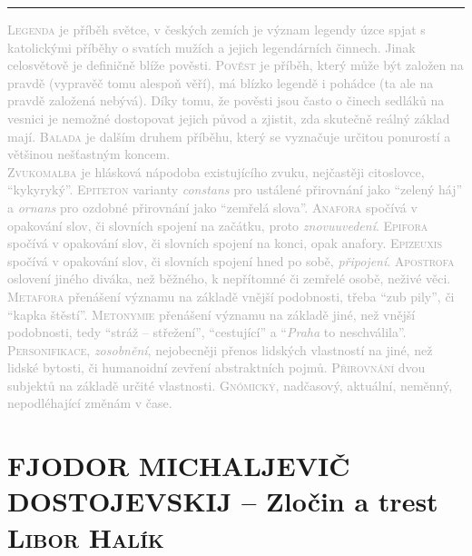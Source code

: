 \documentclass[A4paper]{extarticle} %
\begin{document}
\noindent\begin{minipage}{\textwidth}
    \textcolor{darkgray}{\rule{\linewidth}{0.4pt}
    \changefontsize{7pt}
    \footnotesize
    \textsc{Legenda} je příběh světce, v českých zemích je význam legendy úzce spjat s katolickými příběhy o svatích mužích a jejich legendárních činnech. Jinak celosvětově je definičně blíže pověsti.
    \textsc{Pověst} je příběh, který může být založen na pravdě (vypravěč tomu alespoň věří), má blízko legendě i pohádce (ta ale na pravdě založená nebývá). Díky tomu, že pověsti jsou často o činech sedláků na vesnici je nemožné dostopovat jejich původ a zjistit, zda skutečně reálný základ mají.
    \textsc{Balada} je dalším druhem příběhu, který se vyznačuje určitou ponurostí a většinou nešťastným koncem. \\
    \textsc{Zvukomalba} je hlásková nápodoba existujícího zvuku, nejčastěji citoslovce, \enquote{kykyryký}.
    \textsc{Epiteton} varianty \textit{constans} pro ustálené přirovnání jako \enquote{zelený háj} a \textit{ornans} pro ozdobné přirovnání jako \enquote{zemřelá slova}.
    \textsc{Anafora} spočívá v opakování slov, či slovních spojení na začátku, proto \textit{znovuuvedení}.
    \textsc{Epifora} spočívá v opakování slov, či slovních spojení na konci, opak anafory.
    \textsc{Epizeuxis} spočívá v opakování slov, či slovních spojení hned po sobě, \textit{připojení}.
    \textsc{Apostrofa} oslovení jiného diváka, než běžného, k nepřítomné či zemřelé osobě, neživé věci.
    \textsc{Metafora} přenášení významu na základě vnější podobnosti, třeba \enquote{zub pily}, či \enquote{kapka štěstí}.
    \textsc{Metonymie} přenášení významu na základě jiné, než vnější podobnosti, tedy \enquote{stráž -- střežení}, \enquote{cestující} a \enquote{\textit{Praha} to neschválila}.
    \textsc{Personifikace}, \textit{zosobnění}, nejobecněji přenos lidských vlastností na jiné, než lidské bytosti, či humanoidní zevření abstraktních pojmů.
    \textsc{Přirovnání} dvou subjektů na základě určité vlastnosti.
    \textsc{Gnómický}, nadčasový, aktuální, neměnný, nepodléhající změnám v čase.
    }
\end{minipage}

\newpage


\changefontsize{8pt}

\part*{FJODOR MICHALJEVIČ DOSTOJEVSKIJ -- Zločin a trest {\hfill \normalfont\tiny\textsc{Libor Halík}}}
\end{document}
